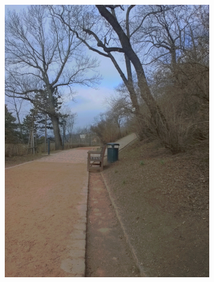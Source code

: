 \begin{figure}[h!]
\begin{subfigure}{0.3\textwidth}
      \includegraphics[width=\textwidth]{figures/tests/tmo/drag3}
  \end{subfigure}
  ~
  \begin{subfigure}{0.3\textwidth}

\end{subfigure}
\end{figure}
